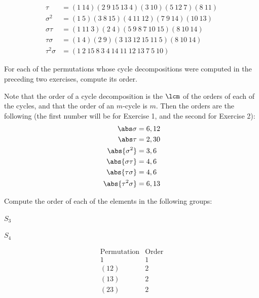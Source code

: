 \begin{problems}
\begin{sol}
\begin{align*}
            \tau & = (1\ 14)(2\ 9\ 15\ 13\ 4)(3\ 10)(5\ 12\ 7)(8\ 11)\\
            \sigma^2 & = (1\ 5)(3\ 8\ 15)(4\ 11\ 12)(7\ 9\ 14)(10\ 13)\\
            \sigma\tau & = (1\ 11\ 3)(2\ 4)(5\ 9\ 8\ 7\ 10\ 15)(8\ 10\ 14)\\
            \tau\sigma & = (1\ 4)(2\ 9)(3\ 13\ 12\ 15\ 11\ 5)(8\ 10\ 14)\\
            \tau^2\sigma & = (1\ 2\ 15\ 8\ 3\ 4\ 14\ 11\ 12\ 13\ 7\ 5\ 10)
        \end{align*}
    \end{sol}
    \item For each of the permutations whose cycle decompositions were computed in the preceding two exercises, compute its order.
    \begin{sol}
        Note that the order of a cycle decomposition is the $\lcm$ of the orders of each of the cycles, and that the order of an $m$-cycle is $m$. Then the orders are the following (the first number will be for Exercise 1, and the second for Exercise 2):
        \begin{align*}
            \abs\sigma & = 6, 12 \\
            \abs\tau & = 2, 30 \\
            \abs{\sigma^2} & = 3, 6 \\
            \abs{\sigma\tau} & = 4, 6 \\
            \abs{\tau\sigma} & = 4, 6 \\
            \abs{\tau^2\sigma} & = 6, 13
        \end{align*}
    \end{sol}
    \item Compute the order of each of the elements in the following groups:
    \begin{problems}
        \item $S_3$
        \item $S_4$
    \end{problems}
    \begin{solalph}
        \item
        $$\begin{array}{c|c}
            \text{Permutation} & \text{Order} \\
            \hline
            1 & 1 \\
            (12) & 2 \\
            (13) & 2 \\
            (23) & 2 \\

\end{array}$$
\end{solalph}
\end{problems}
